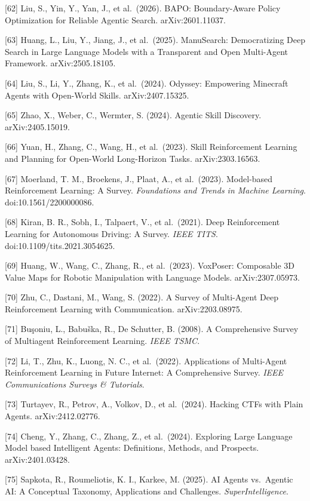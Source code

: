 {[}62{]} Liu, S., Yin, Y., Yan, J., et al.~(2026). BAPO: Boundary-Aware Policy Optimization for Reliable Agentic Search. arXiv:2601.11037.

{[}63{]} Huang, L., Liu, Y., Jiang, J., et al.~(2025). ManuSearch: Democratizing Deep Search in Large Language Models with a Transparent and Open Multi-Agent Framework. arXiv:2505.18105.

{[}64{]} Liu, S., Li, Y., Zhang, K., et al.~(2024). Odyssey: Empowering Minecraft Agents with Open-World Skills. arXiv:2407.15325.

{[}65{]} Zhao, X., Weber, C., Wermter, S. (2024). Agentic Skill Discovery. arXiv:2405.15019.

{[}66{]} Yuan, H., Zhang, C., Wang, H., et al.~(2023). Skill Reinforcement Learning and Planning for Open-World Long-Horizon Tasks. arXiv:2303.16563.

{[}67{]} Moerland, T. M., Broekens, J., Plaat, A., et al.~(2023). Model-based Reinforcement Learning: A Survey. \emph{Foundations and Trends in Machine Learning}. doi:10.1561/2200000086.

{[}68{]} Kiran, B. R., Sobh, I., Talpaert, V., et al.~(2021). Deep Reinforcement Learning for Autonomous Driving: A Survey. \emph{IEEE TITS}. doi:10.1109/tits.2021.3054625.

{[}69{]} Huang, W., Wang, C., Zhang, R., et al.~(2023). VoxPoser: Composable 3D Value Maps for Robotic Manipulation with Language Models. arXiv:2307.05973.

{[}70{]} Zhu, C., Dastani, M., Wang, S. (2022). A Survey of Multi-Agent Deep Reinforcement Learning with Communication. arXiv:2203.08975.

{[}71{]} Buşoniu, L., Babuška, R., De Schutter, B. (2008). A Comprehensive Survey of Multiagent Reinforcement Learning. \emph{IEEE TSMC}.

{[}72{]} Li, T., Zhu, K., Luong, N. C., et al.~(2022). Applications of Multi-Agent Reinforcement Learning in Future Internet: A Comprehensive Survey. \emph{IEEE Communications Surveys \& Tutorials}.

{[}73{]} Turtayev, R., Petrov, A., Volkov, D., et al.~(2024). Hacking CTFs with Plain Agents. arXiv:2412.02776.

{[}74{]} Cheng, Y., Zhang, C., Zhang, Z., et al.~(2024). Exploring Large Language Model based Intelligent Agents: Definitions, Methods, and Prospects. arXiv:2401.03428.

{[}75{]} Sapkota, R., Roumeliotis, K. I., Karkee, M. (2025). AI Agents vs.~Agentic AI: A Conceptual Taxonomy, Applications and Challenges. \emph{SuperIntelligence}.

